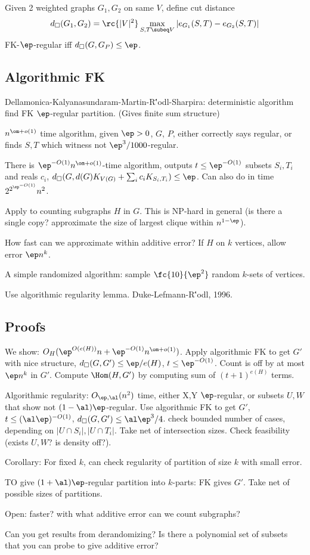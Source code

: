 Given 2 weighted graphs $G_1,G_2$ on same $V$, define cut distance
$$
d_\square(G_1,G_2) = \rc{|V|^2} \max_{S,T\subeq V}|e_{G_1}(S,T)-e_{G_2}(S,T)|
$$
FK-$\ep$-regular iff $d_\square(G,G_P)\le \ep$.


\subsection{Algorithmic FK}
Dellamonica-Kalyanasundaram-Martin-R\''odl-Sharpira: deterministic algorithm find FK $\ep$-regular partition.  (Gives finite sum structure)

$n^{\om+o(1)}$ time algorithm, given $\ep>0$, $G$, $P$, either correctly says regular, or finds $S,T$ which witness not $\ep^3/1000$-regular.

There is $\ep^{-O(1)}n^{\om+o(1)}$-time algorithm, outputs $t\le \ep^{-O(1)}$ subsets $S_i,T_i$ and reals $c_i$, $d_\square (G, d(G) K_{V(G)} + \sum_i c_i K_{S_i,T_i})\le \ep$. Can also do in time $2^{2^{\ep^{-O(1)}}}n^2$. 

Apply to counting subgraphs $H$ in $G$. This is NP-hard in general (is there a single copy? approximate the size of largest clique within $n^{1-\ep}$). 

How fast can we approximate within additive error?  If $H$ on $k$ vertices, allow error $\ep n^k$.

A simple randomized algorithm: sample $\fc{10}{\ep^2}$ random $k$-sets of vertices.

Use algorithmic regularity lemma. Duke-Lefmann-R\''odl, 1996.
\subsection{Proofs}

We show: $O_H(\ep^{O(e(H))}n + \ep^{-O(1)}n^{\om+o(1)})$. Apply algorithmic FK to get $G'$ with nice structure, $d_\square (G,G')\le \ep/e(H)$, $t\le \ep^{-O(1)}$. Count is off by at most $\ep n^k$ in $G'$. 
Compute $\Hom(H,G')$ by computing sum of $(t+1)^{e(H)}$ terms. %

Algorithmic regularity: $O_{\ep,\al}(n^2)$ time, either X,Y $\ep$-regular, or subsets $U,W$ that show not $(1-\al)\ep$-regular. Use algorithmic FK to get $G'$, $t\le (\al\ep)^{-O(1)}$, $d_\square(G,G')\le \al\ep^3/4$. check bounded number of cases, depending on $|U\cap S_i|, |U\cap T_i|$. Take net of intersection sizes. Check feasibility (exists $U,W$? is density off?). 

Corollary: For fixed $k$, can check regularity of partition of size $k$ with small error.

TO give $(1+\al)\ep$-regular partition into $k$-parts: FK gives $G'$. Take net of possible sizes of partitions. 


Open: faster? with what additive error can we count subgraphs?

Can you get results from derandomizing?
Is there  a polynomial set of subsets that you can probe to give additive error?